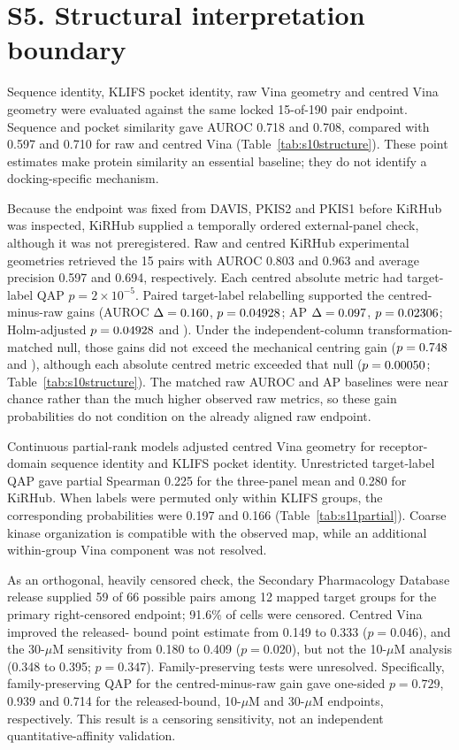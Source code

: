\documentclass[11pt]{article}
\begin{document}
\section*{S5. Structural interpretation boundary}

Sequence identity, KLIFS pocket identity, raw Vina geometry and centred Vina geometry were
evaluated against the same locked 15-of-190 pair endpoint. Sequence and pocket similarity
gave AUROC 0.718 and 0.708, compared with 0.597 and 0.710 for raw and centred Vina
(Table~\ref{tab:s10structure}). These point estimates make protein similarity an essential
baseline; they do not identify a docking-specific mechanism.

Because the endpoint was fixed from DAVIS, PKIS2 and PKIS1 before KiRHub was inspected,
KiRHub supplied a temporally ordered external-panel check, although it was not preregistered.
Raw and centred KiRHub experimental geometries retrieved the 15 pairs with AUROC 0.803 and
0.963 and average precision 0.597 and 0.694, respectively. Each centred absolute metric had
target-label QAP $p=2\times10^{-5}$. Paired target-label relabelling supported the
centred-minus-raw gains (AUROC $\Delta=0.160{}$,
$p=0.04928{}$; AP $\Delta=0.097{}$,
$p=0.02306{}$; Holm-adjusted $p=0.04928{}$ and
\KiRHubGainAPHolmP{}). Under the independent-column transformation-matched null, those
gains did not exceed the mechanical centring gain
($p=0.748{}$ and \KiRHubGainAPMatchedP{}), although each absolute
centred metric exceeded that null ($p=0.00050{}$;
Table~\ref{tab:s10structure}).
The matched raw AUROC and AP baselines were near chance rather than the much higher
observed raw metrics, so these gain probabilities do not condition on the already aligned
raw endpoint.

Continuous partial-rank models adjusted centred Vina geometry for receptor-domain sequence
identity and KLIFS pocket identity. Unrestricted target-label QAP gave partial Spearman
0.225 for the three-panel mean and 0.280 for KiRHub. When labels were permuted only within
KLIFS groups, the corresponding probabilities were 0.197 and 0.166
(Table~\ref{tab:s11partial}). Coarse kinase organization is compatible with the observed
map, while an additional within-group Vina component was not resolved.

As an orthogonal, heavily censored check, the Secondary Pharmacology Database release
supplied 59 of 66 possible pairs among 12 mapped target groups for the primary
right-censored endpoint; 91.6\% of cells were censored. Centred Vina improved the released-
bound point estimate from 0.149 to 0.333 ($p=0.046$), and the 30-$\mu$M sensitivity from
0.180 to 0.409 ($p=0.020$), but not the 10-$\mu$M analysis (0.348 to 0.395; $p=0.347$).
Family-preserving tests were unresolved. Specifically, family-preserving QAP for the
centred-minus-raw gain gave one-sided $p=0.729$, 0.939 and 0.714 for the released-bound,
10-$\mu$M and 30-$\mu$M endpoints, respectively. This result is a censoring sensitivity,
not an independent quantitative-affinity validation.
\end{document}
